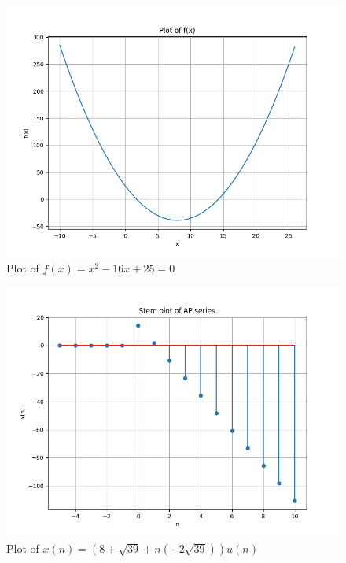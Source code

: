\documentclass[journal,12pt,twocolumn]{IEEEtran}
\providecommand{\brak}[1]{\ensuremath{\left(#1\right)}}
\theoremstyle{remark}
\begin{document}
\begin{figure}[h!]
    \centering
    \includegraphics[width=\columnwidth]{ncert-maths/11/9/3/32/figs/f1.png}
    \caption{Plot of $f\brak{x} = x^2 - 16x + 25 = 0$}
    \label{fig: nik1}
\end{figure}

\begin{figure}[h!]
    \centering
    \includegraphics[width=\columnwidth]{ncert-maths/11/9/3/32/figs/ap.png}
    \caption{Plot of $x\brak{n} = \brak{8+\sqrt{39} + n\brak{-2\sqrt{39}}}u\brak{n}$}
    \label{fig: nik2}
\end{figure}
\end{document}
